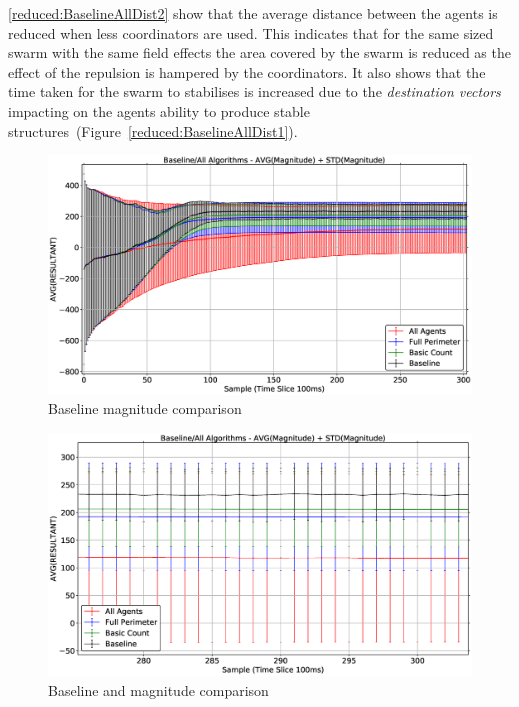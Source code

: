 \autoref{reduced:BaselineAllDist2} show that the average distance between the agents is reduced when less coordinators are used. This indicates that for the same sized swarm with the same field effects the area covered by the swarm is reduced as the effect of the repulsion is hampered by the coordinators. It also shows that the time taken for the swarm to stabilises is increased due to the \textit{destination vectors} impacting on the agents ability to produce stable structures~(Figure~\ref{reduced:BaselineAllDist1}). 

\begin{figure}[H]
\begin{center}
\includegraphics[width=14cm]{CHAPTER-6/figures/BaselineAllMag1}
\end{center}
\caption{Baseline magnitude comparison\label{reduced:BaselineAllMag1}}
\end{figure}

\begin{figure}[H]
\begin{center}
\includegraphics[width=14cm]{CHAPTER-6/figures/BaselineAllMag2}
\end{center}
\caption{Baseline and magnitude comparison\label{reduced:BaselineAllMag2}}
\end{figure}

